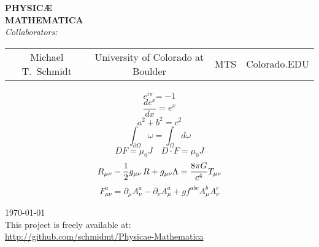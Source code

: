 \begin{titlepage}
\begin{center}
{ \huge \bfseries PHYSIC\AE\\  MATHEMATICA}\\[0.5cm]

\emph{Collaborators:}\\
\begin{tabular}[center]{ccr@{@}l}
    Michael T.\ Schmidt & University of Colorado at Boulder & MTS & Colorado.EDU\\
\end{tabular}


$$ e^{i \pi} = -1 $$
$$ \frac{d e^x}{d x} = e^x $$
$$ a^2 + b^2 = c^2 $$
$$ \int_{\partial \Omega} \omega = \int_\Omega d \omega $$
$$ D F = \mu_0 J \quad D \cdot F = \mu_0 J $$
$$ R_{\mu \nu} - {1 \over 2}g_{\mu \nu}\,R + g_{\mu \nu} \Lambda = {8 \pi G \over c^4} T_{\mu \nu} $$
$$ F^a_{ \mu\nu}=\partial_{\mu}A^{a}_{ \nu} - \partial_{\nu}A^{a}_{ \mu} + g f^{abc}A^{b}_{\mu}A^{c}_{\nu} $$


\vfill
{\large \today}\\

This project is freely available at:\\
\url{http://github.com/schmidmt/Physicae-Mathematica}

\end{center}

\vfill


\end{titlepage}
